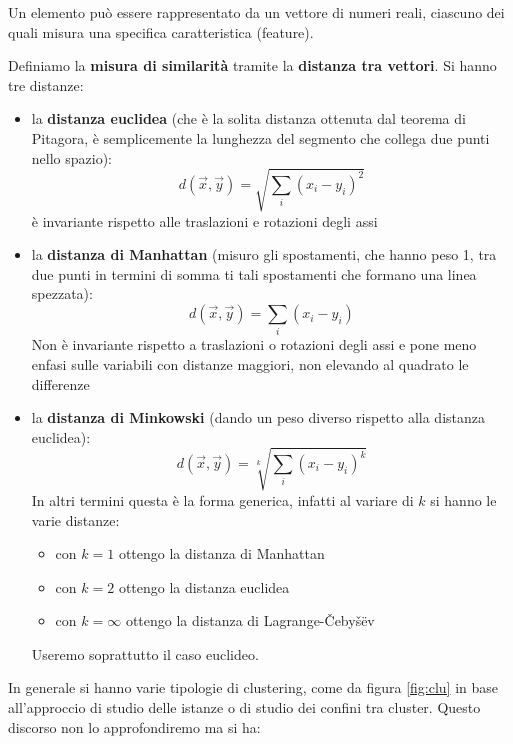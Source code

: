 \documentclass[a4paper,12pt, oneside]{book}
\begin{document}
Un elemento può essere rappresentato da un vettore di numeri reali, ciascuno dei
quali misura una specifica caratteristica (feature).\\
\begin{definizione}
  Definiamo la \textbf{misura di similarità} tramite la \textbf{distanza tra
    vettori}. Si hanno tre distanze:
  \begin{itemize}
    \item la \textbf{distanza euclidea} (che è la solita distanza ottenuta dal
    teorema di Pitagora, è semplicemente la lunghezza del segmento che collega
    due punti nello spazio):
    \[d(\vec{x},\vec{y})=\sqrt{\sum_i (x_i-y_i)^2}\]
    è invariante rispetto alle  traslazioni e rotazioni degli assi
    \item la \textbf{distanza di Manhattan} (misuro gli spostamenti, che hanno
    peso 1, tra due punti in termini di somma ti tali spostamenti che formano
    una linea spezzata):
    \[d(\vec{x},\vec{y})=\sum_i (x_i-y_i)\]
    Non è invariante rispetto a traslazioni o rotazioni degli assi e pone meno
    enfasi sulle variabili con distanze maggiori, non elevando al quadrato le
    differenze
    
    \item la \textbf{distanza di Minkowski} (dando un peso diverso rispetto alla
    distanza euclidea):
    \[d(\vec{x},\vec{y})=\sqrt[k]{\sum_i (x_i-y_i)^k}\]
    In altri termini questa è la forma generica, infatti al variare di $k$ si
    hanno le varie distanze:
    \begin{itemize}
      \item con $k=1$ ottengo la distanza di Manhattan
      \item con $k=2$ ottengo la distanza euclidea
      \item con $k=\infty$ ottengo la distanza di Lagrange-\v{C}eby\v{s}\"{e}v
    \end{itemize}
    Useremo soprattutto il caso euclideo.
  \end{itemize}
\end{definizione}
In generale si hanno varie tipologie di clustering, come da figura \ref{fig:clu}
in base all'approccio di studio delle istanze o di studio dei confini tra
cluster. Questo discorso non lo approfondiremo ma si ha:
\end{document}
